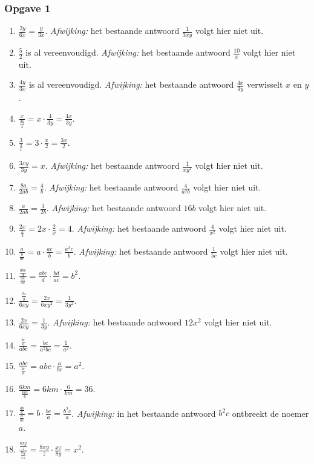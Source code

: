 \subsubsection*{Opgave 1}
\begin{enumerate}[label=\alph*)]
\item $\frac{2y}{6x}=\frac{y}{3x}$. \emph{Afwijking:} het bestaande antwoord $\frac{1}{3xy}$ volgt hier niet uit.
\item $\frac{5}{2}$ is al vereenvoudigd. \emph{Afwijking:} het bestaande antwoord $\frac{10}{x}$ volgt hier niet uit.
\item $\frac{4y}{3x}$ is al vereenvoudigd. \emph{Afwijking:} het bestaande antwoord $\frac{4x}{3y}$ verwisselt $x$ en $y$.
\item $\frac{x}{\frac{3y}{4}}=x\cdot\frac{4}{3y}=\frac{4x}{3y}$.
\item $\frac{3}{\frac{2}{x}}=3\cdot\frac{x}{2}=\frac{3x}{2}$.
\item $\frac{3xy}{3y}=x$. \emph{Afwijking:} het bestaande antwoord $\frac{1}{xy^2}$ volgt hier niet uit.
\item $\frac{8a}{2ab}=\frac{4}{b}$. \emph{Afwijking:} het bestaande antwoord $\frac{4}{a^2b}$ volgt hier niet uit.
\item $\frac{a}{2ab}=\frac{1}{2b}$. \emph{Afwijking:} het bestaande antwoord $16b$ volgt hier niet uit.
\item $\frac{2x}{\frac{x}{2}}=2x\cdot\frac{2}{x}=4$. \emph{Afwijking:} het bestaande antwoord $\frac{4}{x^2}$ volgt hier niet uit.
\item $\frac{a}{\frac{b}{ac}}=a\cdot\frac{ac}{b}=\frac{a^2c}{b}$. \emph{Afwijking:} het bestaande antwoord $\frac{1}{bc}$ volgt hier niet uit.
\item $\frac{\frac{abc}{d}}{\frac{ac}{bd}}=\frac{abc}{d}\cdot\frac{bd}{ac}=b^2$.
\item $\frac{\frac{2x}{y}}{6xy}=\frac{2x}{6xy^2}=\frac{1}{3y^2}$.
\item $\frac{2x}{6xy}=\frac{1}{3y}$. \emph{Afwijking:} het bestaande antwoord $12x^2$ volgt hier niet uit.
\item $\frac{\frac{bc}{a}}{abc}=\frac{bc}{a^2bc}=\frac{1}{a^2}$.
\item $\frac{abc}{\frac{bc}{a}}=abc\cdot\frac{a}{bc}=a^2$.
\item $\frac{6km}{\frac{km}{6}}=6km\cdot\frac{6}{km}=36$.
\item $\frac{\frac{ab}{a}}{\frac{a}{bc}}=b\cdot\frac{bc}{a}=\frac{b^2c}{a}$. \emph{Afwijking:} in het bestaande antwoord $b^2c$ ontbreekt de noemer $a$.
\item $\frac{\frac{8xy}{z}}{\frac{8y}{xz}}=\frac{8xy}{z}\cdot\frac{xz}{8y}=x^2$.
\end{enumerate}

